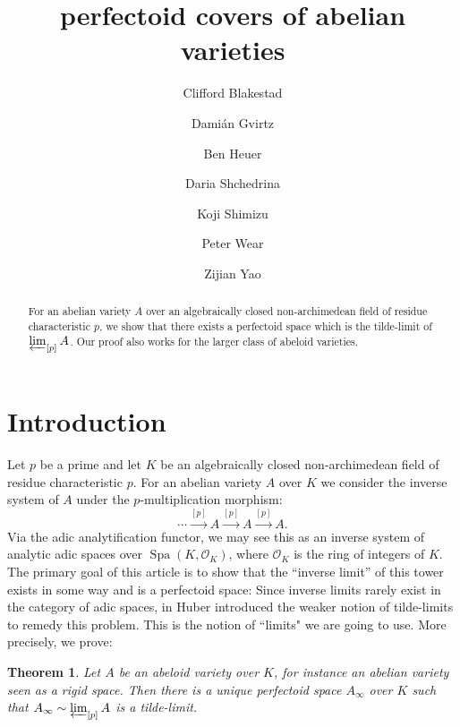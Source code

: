\documentclass[10pt,oneside]{amsart}
\title[perfectoid covers of abelian varieties]{perfectoid  covers of abelian varieties}
\author{
	Clifford Blakestad \and
	Dami\'an Gvirtz \and
	Ben Heuer \and 
	Daria Shchedrina \and
	Koji Shimizu \and 
	Peter Wear \and
	Zijian Yao}
\newtheorem{mainthm}{Theorem}
\theoremstyle{definition}
\begin{document}
	
	\maketitle
	
	\begin{abstract}
For an abelian variety $A$ over an algebraically closed non-archimedean field of residue characteristic $p$, we show that there exists a perfectoid space which is the tilde-limit of $\varprojlim_{[p]}A$. Our proof also works for the larger class of abeloid varieties.
	\end{abstract}
	

	
	\section{Introduction} 

Let $p$ be a prime and let $K$ be an algebraically closed non-archimedean field of residue characteristic $p$.
For an abelian variety $A$ over $K$ we consider the inverse system of $A$ under the $p$-multiplication morphism:
\[\cdots\xrightarrow{[p]}A\xrightarrow{[p]}A\xrightarrow{[p]}A.\]
Via the adic analytification functor, we may see this as an inverse system of analytic adic spaces over $\operatorname{Spa}(K,\mathcal O_K)$, where $\mathcal O_K$ is the ring of integers of $K$.
The primary goal of this article is to show that the ``inverse limit'' of this tower exists in some way and is a perfectoid space: Since inverse limits rarely exist in the category of adic spaces, in \cite{huber2013etale} Huber introduced the weaker notion of tilde-limits to remedy this problem. This is the notion of ``limits" we are going to use. More precisely, we prove:

 


\begin{mainthm} \label{thm:main_thm_intro}
	Let $A$ be an abeloid variety over $K$, for instance an abelian variety seen as a rigid space. Then there is a unique perfectoid space $A_\infty$ over $K$ such that
	$A_\infty \sim \varprojlim_{[p]} A$ is a tilde-limit.
\end{mainthm}
\end{document}
